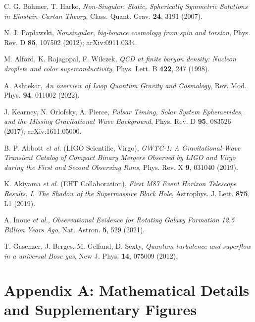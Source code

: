 \documentclass{article}
\begin{document}
\begin{thebibliography}{99}
  C. G. Böhmer, T. Harko,  
  \emph{Non‐Singular, Static, Spherically Symmetric Solutions in Einstein–Cartan Theory},  
  Class. Quant. Grav. \textbf{24}, 3191 (2007).  

  N. J. Popławski,  
  \emph{Nonsingular, big‐bounce cosmology from spin and torsion},  
  Phys. Rev. D \textbf{85}, 107502 (2012); arXiv:0911.0334.  

  M. Alford, K. Rajagopal, F. Wilczek,  
  \emph{QCD at finite baryon density: Nucleon droplets and color superconductivity},  
  Phys. Lett. B \textbf{422}, 247 (1998).  

  A. Ashtekar,  
  \emph{An overview of Loop Quantum Gravity and Cosmology},  
  Rev. Mod. Phys. \textbf{94}, 011002 (2022).  

  J. Kearney, N. Orlofsky, A. Pierce,  
  \emph{Pulsar Timing, Solar System Ephemerides, and the Missing Gravitational Wave Background},  
  Phys. Rev. D \textbf{95}, 083526 (2017); arXiv:1611.05000.  

  B. P. Abbott \emph{et al.} (LIGO Scientific, Virgo),  
  \emph{GWTC-1: A Gravitational‐Wave Transient Catalog of Compact Binary Mergers Observed by LIGO and Virgo during the First and Second Observing Runs},  
  Phys. Rev. X \textbf{9}, 031040 (2019).  

  K. Akiyama \emph{et al.} (EHT Collaboration),  
  \emph{First M87 Event Horizon Telescope Results. I. The Shadow of the Supermassive Black Hole},  
  Astrophys. J. Lett. \textbf{875}, L1 (2019).  

  A. Inoue \emph{et al.},  
  \emph{Observational Evidence for Rotating Galaxy Formation 12.5 Billion Years Ago},  
  Nat. Astron. \textbf{5}, 529 (2021).  

  T. Gasenzer, J. Berges, M. Gelfand, D. Sexty,  
  \emph{Quantum turbulence and superflow in a universal Bose gas},  
  New J. Phys. \textbf{14}, 075009 (2012).  

\end{thebibliography}

\clearpage

\clearpage
\appendix

\section{Appendix A: Mathematical Details and Supplementary Figures}
\label{app:math_supp}
\end{document}
